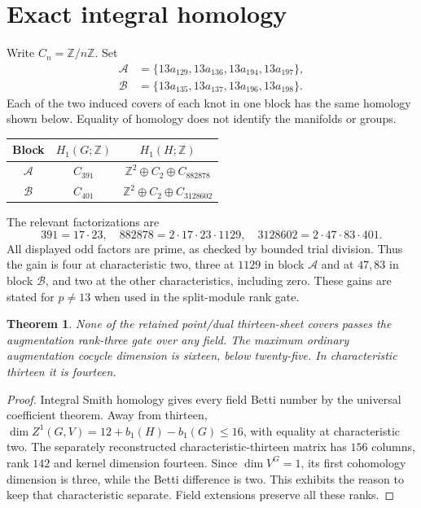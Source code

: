 \documentclass[11pt]{article}
\newtheorem{theorem}[proposition]{Theorem}
\begin{document}
\section{Exact integral homology}

Write $C_n=\mathbb Z/n\mathbb Z$. Set
\begin{align*}
 \mathcal A&=\{13a_{129},13a_{136},13a_{194},13a_{197}\},\\
 \mathcal B&=\{13a_{135},13a_{137},13a_{196},13a_{198}\}.
\end{align*}
Each of the two induced covers of each knot in one block
has the same homology shown below. Equality of homology
does not identify the manifolds or groups.
\begin{center}
\begin{tabular}{ccc}
\toprule
Block & $H_1(G;\mathbb Z)$ & $H_1(H;\mathbb Z)$\\
\midrule
$\mathcal A$ & $C_{391}$ & $\mathbb Z^2\oplus C_2\oplus C_{882878}$\\
$\mathcal B$ & $C_{401}$ & $\mathbb Z^2\oplus C_2\oplus C_{3128602}$\\
\bottomrule
\end{tabular}
\end{center}
The relevant factorizations are
\[
391=17\cdot23,\quad
882878=2\cdot17\cdot23\cdot1129,\quad
3128602=2\cdot47\cdot83\cdot401.
\]
All displayed odd factors are prime, as checked by bounded
trial division. Thus the gain is four at characteristic two,
three at $1129$ in block $\mathcal A$ and at $47,83$ in block
$\mathcal B$, and two at the other characteristics, including
zero. These gains are stated for $p\ne13$ when used in the
split-module rank gate.

\begin{theorem}
None of the retained point/dual thirteen-sheet covers passes
the augmentation rank-three gate over any field. The maximum
ordinary augmentation cocycle dimension is sixteen, below
twenty-five. In characteristic thirteen it is fourteen.
\end{theorem}
\begin{proof}
Integral Smith homology gives every field Betti number by
the universal coefficient theorem. Away from thirteen,
$\dim Z^1(G,V)=12+b_1(H)-b_1(G)\le16$, with equality at
characteristic two. The separately reconstructed
characteristic-thirteen matrix has $156$ columns, rank $142$
and kernel dimension fourteen. Since $\dim V^G=1$, its first
cohomology dimension is three, while the Betti difference is
two. This exhibits the reason to keep that characteristic
separate. Field extensions preserve all these ranks.
\end{proof}
\end{document}
